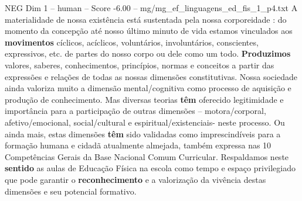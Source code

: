 \begin{textsample}{NEG Dim 1 – human – Score -6.00 – mg/mg\_ef\_linguagens\_ed\_fis\_1\_p4.txt}  \label{ex:f1_neg_019}
A materialidade de nossa existência está sustentada pela nossa corporeidade : do momento da concepção até nosso último minuto de vida estamos vinculados aos \textbf{movimentos} cíclicos, acíclicos, voluntários, involuntários, conscientes, expressivos, etc. de partes do nosso corpo ou dele como um todo. \textbf{Produzimos} valores, saberes, conhecimentos, princípios, normas e conceitos a partir das expressões e relações de todas as nossas dimensões constitutivas.
Nossa sociedade ainda valoriza muito a dimensão mental/cognitiva como processo de aquisição e produção de conhecimento.
Mas diversas teorias \textbf{têm} oferecido legitimidade e importância para a participação de outras dimensões – motora/corporal, afetivo/emocional, social/cultural e espiritual/existenciais- neste processo.
Ou ainda mais, estas dimensões \textbf{têm} sido validadas como imprescindíveis para a formação humana e cidadã atualmente almejada, também expressa nas 10 Competências Gerais da Base Nacional Comum Curricular.
Respaldamos neste \textbf{sentido} as aulas de Educação Física na escola como tempo e espaço privilegiado que pode garantir o \textbf{reconhecimento} e a valorização da vivência destas dimensões e seu potencial formativo.

\end{textsample}
